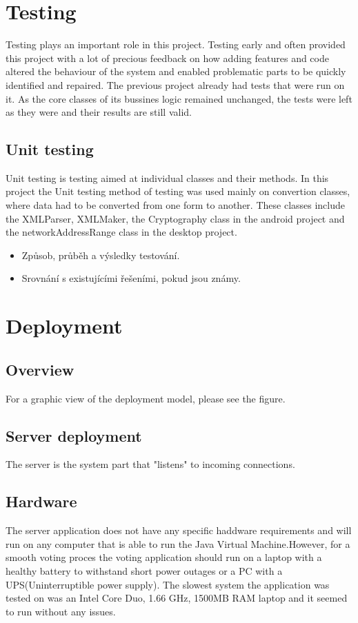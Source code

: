 \documentclass[11pt,twoside,a4paper]{book}
\begin{document}
\chapter{Testing}
Testing plays an important role in this project. Testing early and often provided this project with a lot of precious feedback on how adding features and code altered the behaviour of the system and enabled problematic parts to be quickly identified and repaired. The previous project \cite{baklarkaJV} already had tests that were run on it. As the core classes of its bussines logic remained unchanged, the tests were left as they were and their results are still valid.
\section{Unit testing}
Unit testing is testing aimed at individual classes and their methods. In this project the Unit testing method of testing was used mainly on convertion classes, where data had to be converted from one form to another. These classes include the XMLParser, XMLMaker, the Cryptography class in the android project and the networkAddressRange class in the desktop project. 

\begin{itemize}
 \item Způsob, průběh a výsledky testování.
 \item Srovnání s existujícími řešeními, pokud jsou známy.
\end{itemize} 
 \chapter{Deployment}
\section{Overview}
For a graphic view of the deployment model, please see the figure. 
\section{Server deployment}
The server is the system part that "listens" to incoming connections.
\section{Hardware}
The server application does not have any specific haddware requirements and will run on any computer that is able to run the Java Virtual Machine.However, for a smooth voting proces the voting application should run on a laptop with a healthy battery to withstand short power outages or a PC with a UPS(Uninterruptible power supply). The slowest system the application was tested on was an Intel Core Duo, 1.66 GHz, 1500MB RAM laptop and it seemed to run without any issues. 
\end{document}
